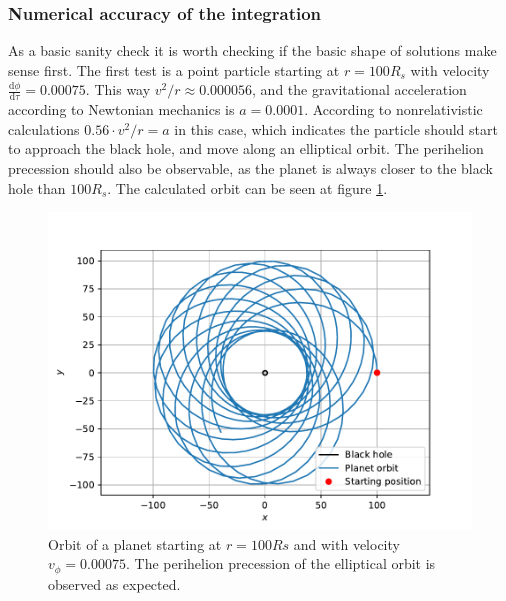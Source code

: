 \documentclass[pdftex,12pt,a4paper]{article}
\begin{document}
	\subsubsection{Numerical accuracy of the integration}
		As a basic sanity check it is worth checking if the basic shape of solutions make sense first. The first test is a point particle starting at $r = 100R_s$ with velocity $\frac{\mathrm{d}\phi}{\mathrm{d}\tau} = 0.00075$. This way $v^2/r \approx 0.000056$, and the gravitational acceleration according to Newtonian mechanics is $a = 0.0001$. According to nonrelativistic calculations $0.56 \cdot v^2 / r = a$ in this case, which indicates the particle should start to approach the black hole, and move along an elliptical orbit. The perihelion precession should also be observable, as the planet is always closer to the black hole than $100R_s$. The calculated orbit can be seen at figure \ref{orbit}.
		\begin{figure}[H]
			\centering
			\includegraphics[scale=1]{./figs/planetOrbit.pdf}
			\caption{Orbit of a planet starting at $r = 100Rs$ and with velocity $v_\phi = 0.00075$. The perihelion precession of the elliptical orbit is observed as expected.}
			\label{orbit}
		\end{figure}
		
\end{document}
